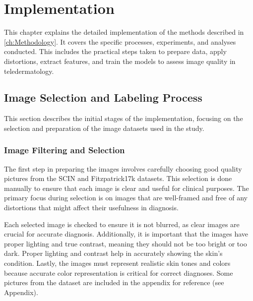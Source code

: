 \chapter{Implementation}
\label{ch:Implementation}
This chapter explains the detailed implementation of the methods described in \autoref{ch:Methodology}. It covers the specific processes, experiments, and analyses conducted. This includes the practical steps taken to prepare data, apply distortions, extract features, and train the models to assess image quality in teledermatology. \par

\section{Image Selection and Labeling Process}
\label{sec:ImgSelectLabel}
This section describes the initial stages of the implementation, focusing on the selection and preparation of the image datasets used in the study. \par

\subsection{Image Filtering and Selection}
\label{sub:ImgFilterSelect}
The first step in preparing the images involves carefully choosing good quality pictures from the SCIN and Fitzpatrick17k datasets. This selection is done manually to ensure that each image is clear and useful for clinical purposes. The primary focus during selection is on images that are well-framed and free of any distortions that might affect their usefulness in diagnosis. \par
\vspace{\baselineskip}
\noindent
Each selected image is checked to ensure it is not blurred, as clear images are crucial for accurate diagnosis. Additionally, it is important that the images have proper lighting and true contrast, meaning they should not be too bright or too dark. Proper lighting and contrast help in accurately showing the skin’s condition. Lastly, the images must represent realistic skin tones and colors because accurate color representation is critical for correct diagnoses. Some pictures from the dataset are included in the appendix for reference (see Appendix). \par

